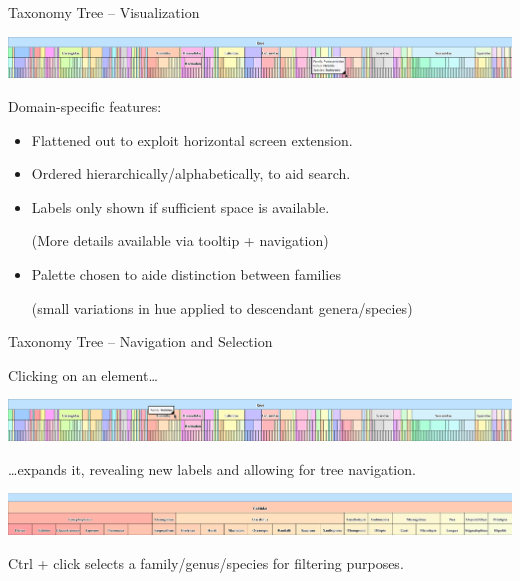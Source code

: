 \documentclass{beamer}
\begin{document}
\begin{frame}{Taxonomy Tree --  Visualization}

  \centerline{
  \includegraphics[width=\paperwidth]{./img/taxa.png}
  }

  Domain-specific features:

  \begin{itemize}

    \item Flattened out to exploit horizontal screen extension.
      
    \item Ordered hierarchically/alphabetically, to aid search.
      
    \item Labels only shown if sufficient space is available.

      {\small (More details available via tooltip + navigation)}

    \item Palette chosen to aide distinction between families
      
      {\small (small variations in hue applied to descendant genera/species)}

  \end{itemize}


\end{frame}

\begin{frame}{Taxonomy Tree -- Navigation and Selection}

  Clicking on an element\dots

  \centerline{
  \includegraphics[width=\paperwidth]{./img/taxa_click.png}
  }

  \dots expands it, revealing new labels and allowing for tree navigation.

  \centerline{
  \includegraphics[width=\paperwidth]{./img/taxa_expanded.png}
  }

  Ctrl + click selects a family/genus/species for filtering purposes.

\end{frame}
\end{document}
